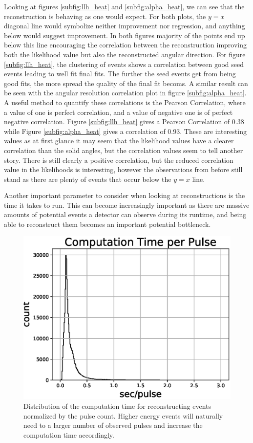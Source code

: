 Looking at figures \ref{subfig:llh_heat} and \ref{subfig:alpha_heat}, we can see that the reconstruction is behaving as one would expect. For both plots, the $y=x$ diagonal line would symbolize neither improvement nor regression, and anything below would suggest improvement. In both figures majority of the points end up below this line encouraging the correlation between the reconstruction improving both the likelihood value but also the reconstructed angular direction. For figure \ref{subfig:llh_heat}, the clustering of events shows a correlation between good seed events leading to well fit final fits. The further the seed events get from being good fits, the more spread the quality of the final fit becoms. A similar result can be seen with the angular resolution correlation plot in figure \ref{subfig:alpha_heat}. A useful method to quantify these correlations is the Pearson Correlation, where a value of one is perfect correlation, and a value of negative one is of perfect negative correlation. Figure \ref{subfig:llh_heat} gives a Pearson Correlation of 0.38 while Figure \ref{subfig:alpha_heat} gives a correlation of 0.93. These are interesting values as at first glance it may seem that the likelihood values have a clearer correlation than the solid angles, but the correlation values seem to tell another story. There is still clearly a positive correlation, but the reduced correlation value in the likelihoods is interesting, however the observations from before still stand as there are plenty of events that occur below the $y=x$ line. 

Another important parameter to consider when looking at reconstructions is the time it takes to run. This can become increasingly important as there are massive amounts of potential events a detector can observe during its runtime, and being able to reconstruct them becomes an important potential bottleneck. 

\begin{figure}[H]
  \centering
  \includegraphics[width=12cm]{./Figures/reco_plots/computation_time_perpulse.eps}
  \caption{Distribution of the computation time for reconstructing events normalized by the pulse count. Higher energy events will naturally need to a larger number of observed pulses and increase the computation time accordingly. }
  \label{fig:comp_time}
\end{figure}

